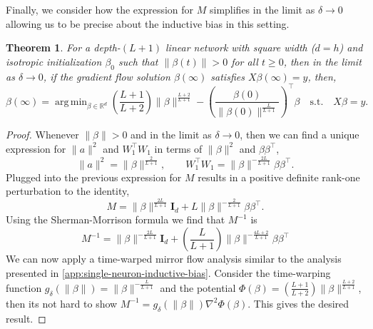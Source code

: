 \documentclass{article}
\theoremstyle{plain}
\newtheorem{theorem}{Theorem}[section]
\theoremstyle{definition}
\theoremstyle{remark}
\DeclareMathOperator*{\argmin}{arg\,min}
\begin{document}
Finally, we consider how the expression for $M$ simplifies in the limit as $\delta \to 0$ allowing us to be precise about the inductive bias in this setting.

\begin{theorem}
    \label{thm:deep-rich}
    For a depth-$(L+1)$ linear network with square width ($d = h$) and isotropic initialization $\beta_0$ such that $\|\beta(t)\| > 0$ for all $t \ge 0$, then in the limit as $\delta \to 0$, if the gradient flow solution $\beta(\infty)$ satisfies $X \beta(\infty) = y$, then,
    \begin{equation}
        \beta(\infty) = \argmin_{\beta \in \mathbb{R}^d} \left(\frac{L+1}{L+2}\right)\|\beta\|^{\frac{L+2}{L+1}} - \left(\frac{\beta(0)}{\|\beta(0)\|^{\frac{L}{L+1}}}\right)^\intercal \beta \quad \mathrm{s.t.} \quad X \beta = y.
    \end{equation}
\end{theorem}

\begin{proof}
    Whenever $\|\beta\| > 0$ and in the limit as $\delta \to 0$, then we can find a unique expression for $\|a\|^2$ and $W_1^\intercal W_1$ in terms of $\|\beta\|^2$ and $\beta\beta^\intercal$,
    \begin{equation}
        \|a\|^2 = \|\beta\|^{\frac{2}{L+1}}, \qquad W_1^\intercal W_1 = \|\beta\|^{-\frac{2L}{L+1}} \beta\beta^\intercal.
    \end{equation}
    Plugged into the previous expression for $M$ results in a positive definite rank-one perturbation to the identity,
    \begin{equation}
        M =  \|\beta\|^{\frac{2L}{L+1}} \mathbf{I}_d + L\|\beta\|^{-\frac{2}{L+1}} \beta\beta^\intercal.
    \end{equation}
    Using the Sherman-Morrison formula we find that $M^{-1}$ is
    \begin{equation}
        M^{-1} = \|\beta\|^{-\frac{2L}{L+1}}\mathbf{I}_d + \left(\frac{L}{L+1}\right)\|\beta\|^{-\frac{4L+2}{L+1}}\beta\beta^\intercal
    \end{equation}
    We can now apply a time-warped mirror flow analysis similar to the analysis presented in \cref{app:single-neuron-inductive-bias}.
    Consider the time-warping function $g_\delta(\|\beta\|) = \|\beta\|^{-\frac{L}{L+1}}$ and the potential $\Phi(\beta) = \left(\frac{L+1}{L+2}\right)\|\beta\|^{\frac{L+2}{L+1}}$, then its not hard to show $M^{-1} = g_\delta(\|\beta\|)\nabla^2\Phi(\beta)$.
    This gives the desired result.
\end{proof}
\end{document}
